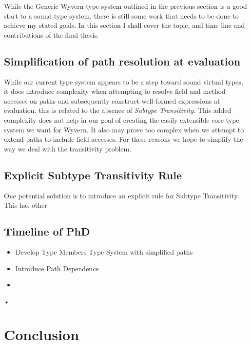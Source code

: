 \documentclass[11pt
              , a4paper
              , twoside
              , openright
              ]{report}
\numberwithin{case}{theorem}
\numberwithin{subcase}{case}
\begin{document}
While the Generic Wyvern type system outlined in the previous section is a good start to a sound type system, there is still some work that needs to be done to achieve my stated goals. In this section I shall cover the topic, and time line and contributions of the final thesis.

\section{Simplification of path resolution at evaluation}
While our current type system appears to be a step toward sound virtual types, it does introduce complexity when attempting to resolve field and method accesses on paths and subsequently construct well-formed expressions at evaluation. this is related to the absence of \emph{Subtype Transitivity}. This added complexity does not help in our goal of creating the easily extensible core type system we want for Wyvern. It also may prove too complex when we attempt to extend paths to include field accesses. For these reasons we hope to simplify the way we deal with the transitivity problem.

\section{Explicit Subtype Transitivity Rule}
One potential solution is to introduce an explicit rule for Subtype Transitivity. This has other

\section{Timeline of PhD}
\begin{itemize}
\item
Develop Type Members Type System with simplified paths
\item
Introduce Path Dependence
\item

\end{itemize}•



\chapter{Conclusion}\label{ch:conclusion}



\backmatter



%


\end{document}
